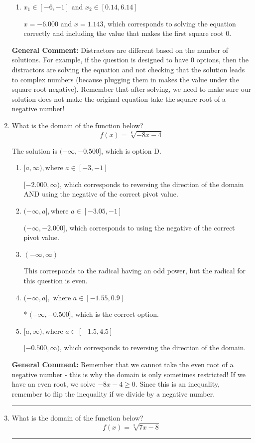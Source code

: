\documentclass{extbook}[14pt]
\newcommand{\litem}[1]{\item #1

\rule{\textwidth}{0.4pt}}
\begin{document}
\begin{enumerate}
{\begin{enumerate}[label=\Alph*.]
$x = 0.250$ and $x = 1.143$, which corresponds to solving each radical separately for 0.
\item \( x_1 \in [-6, -1] \text{ and } x_2 \in [0.14,6.14] \)

$x = -6.000$ and $x = 1.143$, which corresponds to solving the equation correctly and including the value that makes the first square root 0.
\end{enumerate}

\textbf{General Comment:} Distractors are different based on the number of solutions. For example, if the question is designed to have 0 options, then the distractors are solving the equation and not checking that the solution leads to complex numbers (because plugging them in makes the value under the square root negative). Remember that after solving, we need to make sure our solution does not make the original equation take the square root of a negative number!
}
\litem{
What is the domain of the function below?
\[ f(x) = \sqrt[8]{-8 x - 4} \]

The solution is \( (-\infty, -0.500] \), which is option D.\begin{enumerate}[label=\Alph*.]
\item \( [a, \infty), \text{where } a \in [-3, -1] \)

$[-2.000, \infty)$, which corresponds to reversing the direction of the domain AND using the negative of the correct pivot value.
\item \( (-\infty, a], \text{where } a \in [-3.05, -1] \)

$(-\infty, -2.000]$, which corresponds to using the negative of the correct pivot value.
\item \( (-\infty, \infty) \)

This corresponds to the radical having an odd power, but the radical for this question is even.
\item \( (-\infty, a], \text{ where } a \in [-1.55, 0.9] \)

* $(-\infty, -0.500]$, which is the correct option.
\item \( [a, \infty), \text{where } a \in [-1.5, 4.5] \)

 $[-0.500, \infty)$, which corresponds to reversing the direction of the domain.
\end{enumerate}

\textbf{General Comment:} Remember that we cannot take the even root of a negative number - this is why the domain is only sometimes restricted! If we have an even root, we solve $-8 x - 4 \geq 0$. Since this is an inequality, remember to flip the inequality if we divide by a negative number.
}
\litem{
What is the domain of the function below?
\[ f(x) = \sqrt[5]{7 x - 8} \]

}
\end{enumerate}
\end{document}

